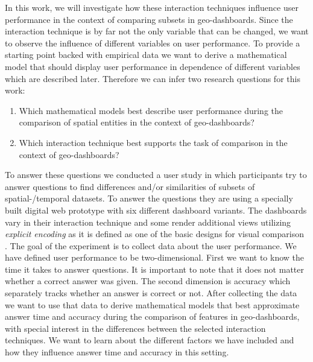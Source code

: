 In this work, we will investigate how these interaction techniques influence user performance in the context of comparing subsets in
geo-dashboards. Since the interaction technique is by far not the only variable that can be changed, we want to observe the influence
of different variables on user performance. To provide a starting point backed with empirical data we want to derive a mathematical model
that should display user performance in dependence of different variables which are described later. Therefore we can infer two research
questions for this work:
\begin{enumerate}
    \item Which mathematical models best describe user performance during the comparison of spatial entities
    in the context of geo-dashboards?
    \item Which interaction technique best supports the task of comparison in the context of
    geo-dashboards? 
\end{enumerate}

To answer these questions we conducted a user study in which participants try to answer questions to find differences and/or similarities
of subsets of spatial-/temporal datasets. To answer the questions they are using a specially built digital web prototype with six different
dashboard variants. The dashboards vary in their interaction technique and some render additional views utilizing \textit{explicit encoding}
as it is defined as one of the basic designs for visual comparison \citep*{Gleicher.2018}. The goal of the experiment is to collect data
about the user performance. We have defined user performance to be two-dimensional. First we want to know the time it takes to answer
questions. It is important to note that it does not matter whether a correct answer was given. The second dimension is accuracy which
separately tracks whether an answer is correct or not. After collecting the data we want to use that data to derive mathematical
models that best approximate answer time and accuracy during the comparison of features in
geo-dashboards, with special interest in the differences between the selected interaction techniques. We want to learn 
about the different factors we have included and how they influence answer time and accuracy in this setting.

